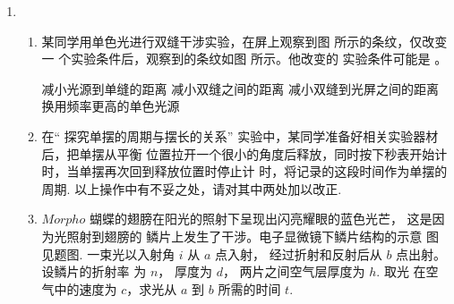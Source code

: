 \begin{enumerate}
\item 
{}
\begin{enumerate}
	\item
某同学用单色光进行双缝干涉实验，在屏上观察到图  所示的条纹，仅改变一
个实验条件后，观察到的条纹如图  所示。他改变的
实验条件可能是 \underlinegap 。
\begin{figure}[h!]
	\centering
	\begin{subfigure}{0.4\linewidth}
		\centering
		 
		\caption{}\label{2014江苏12Ba}
	\end{subfigure}
	\begin{subfigure}{0.4\linewidth}
		\centering
		 
		\caption{}\label{2014江苏12Bb}
	\end{subfigure}
	
\end{figure}

\fourchoices
{减小光源到单缝的距离}
{减小双缝之间的距离}
{减小双缝到光屏之间的距离}
{换用频率更高的单色光源}



\item 
在“ 探究单摆的周期与摆长的关系” 实验中，某同学准备好相关实验器材后，把单摆从平衡
位置拉开一个很小的角度后释放，同时按下秒表开始计时，当单摆再次回到释放位置时停止计
时，将记录的这段时间作为单摆的周期. 以上操作中有不妥之处，请对其中两处加以改正.


 \hfullline 


	
\item 
$ Morpho $ 蝴蝶的翅膀在阳光的照射下呈现出闪亮耀眼的蓝色光芒， 这是因为光照射到翅膀的
鳞片上发生了干涉。电子显微镜下鳞片结构的示意
图见题图. 一束光以入射角 $ i $ 从 $ a $ 点入射，
经过折射和反射后从 $ b $ 点出射。 设鳞片的折射率
为 $ n $， 厚度为 $ d $， 两片之间空气层厚度为 $ h $. 取光
在空气中的速度为 $ c $，求光从 $ a $ 到 $ b $ 所需的时间 $ t $.
\begin{figure}[h!]
	\flushright
	
\end{figure}



\end{enumerate}
\end{enumerate}
